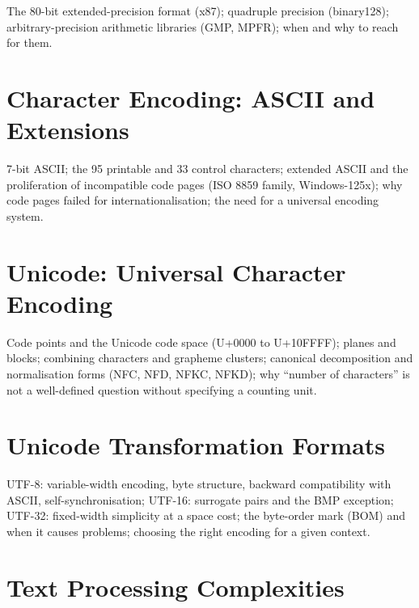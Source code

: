 The 80-bit extended-precision format (x87); quadruple precision (binary128);
arbitrary-precision arithmetic libraries (GMP, MPFR); when and why to reach
for them.


%

\chapter{Character Encoding: ASCII and Extensions}
\label{ch:ascii}

7-bit ASCII; the 95 printable and 33 control characters; extended ASCII and
the proliferation of incompatible code pages (ISO 8859 family,
Windows-125x); why code pages failed for internationalisation; the need for
a universal encoding system.

\chapter{Unicode: Universal Character Encoding}
\label{ch:unicode}

Code points and the Unicode code space (U+0000 to U+10FFFF); planes and
blocks; combining characters and grapheme clusters; canonical decomposition
and normalisation forms (NFC, NFD, NFKC, NFKD); why ``number of
characters'' is not a well-defined question without specifying a counting
unit.

\chapter{Unicode Transformation Formats}
\label{ch:utf}

UTF-8: variable-width encoding, byte structure, backward compatibility with
ASCII, self-synchronisation; UTF-16: surrogate pairs and the BMP exception;
UTF-32: fixed-width simplicity at a space cost; the byte-order mark (BOM)
and when it causes problems; choosing the right encoding for a given context.

\chapter{Text Processing Complexities}
\label{ch:text-processing}

